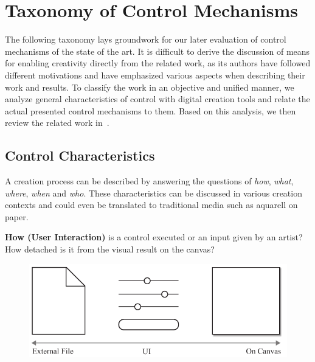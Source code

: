 

\section{Taxonomy of Control Mechanisms}\label{sec:taxo_control_mechanism}

The following taxonomy lays groundwork for our later evaluation of control mechanisms of the state of the art. It is difficult to derive the discussion of means for enabling creativity directly from the related work, as its authors have followed different motivations and have emphasized various aspects when describing their work and results. To classify the work in an objective and unified manner, we analyze general characteristics of control with digital creation tools and relate the actual presented control mechanisms to them. Based on this analysis, we then review the related work in~.

\newcommand{\controlParamsFigWidth}{0.9}

\subsection{Control Characteristics}\label{control_charateristics}
A creation process can be described by answering the questions of \textit{how}, \textit{what}, \textit{where}, \textit{when} and \textit{who}. These characteristics can be discussed in various creation contexts and could even be translated to traditional media such as aquarell on paper.

\noindent\textbf{How (User Interaction)} is a control executed or an input given by an artist? How detached is it from the visual result on the canvas? 

\begin{figure}[H]
    \centering
        \includegraphics[width=\controlParamsFigWidth\linewidth]{figures/control_paradigms/how.pdf}
\end{figure}

